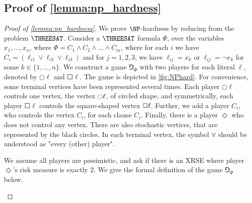 \subsection{Proof of \cref{lemma:np_hardness}}\label{app:np_hardness}
\NPHard*
\begin{proof}[Proof of \cref{lemma:np_hardness}]
  We prove $\NP$-hardness by reducing from the problem $\THREESAT$. Consider a $\THREESAT$ formula $\Phi$, over the variables  $x_1,\dots,x_n$, where $\Phi = C_1\land C_2\land \dots\land C_m$, where for each $i$ we have $C_i = (\ell_{i1}\lor \ell_{i2}\lor \ell_{i3})$ and for $j=1,2,3$, we have $\ell_{ij} = x_k$ or $\ell_{ij} = \neg x_k$ for some $k\in \{1, \dots, n\}$. 
  We construct  a game $\Game_\Phi$ with two players for each literal $\ell$, denoted by $\Circle \ell$ and $\Square \ell$. The game is depicted in \cref{fig:NPhard}.
  For convenience, some terminal vertices have been represented several times.
  Each player $\Circle \ell$ controls one vertex, the vertex $\Circle \l$, of circled shape, and symmetrically, each player $\Square \ell$ controls the square-shaped vertex $\Square \l$.
  Further, we add a player $C_i$, who controls the vertex $C_i$, for each clause $C_i$. Finally, there is a player $\Diamond$ who does not control any vertex. There are also stochastic vertices, that are represented by the black circles.
  In each terminal vertex, the symbol $\forall$ should be understood as "every (other) player".


 We assume all players are pessimistic, and ask if there is an XRSE where player $\Diamond$'s risk measure is exactly $2$.
We give the formal definition of the game $\Game_\Phi$ below.

    \begin{figure}
        \centering
        
\end{figure}
\end{proof}
